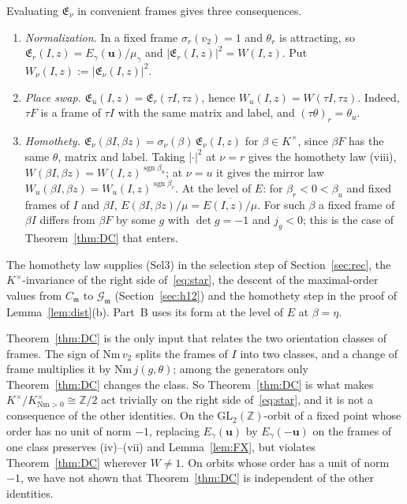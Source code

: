 \documentclass[11pt]{amsart}
\numberwithin{equation}{section}
\theoremstyle{plain}
\theoremstyle{definition}
\theoremstyle{remark}
\begin{document}
Evaluating \(\mathfrak E_\nu\) in convenient frames gives three consequences.
\begin{enumerate}
\item[(a)] \emph{Normalization.} In a fixed frame \(\sigma_r(v_2)=1\) and \(\theta_r\) is attracting, so \(\mathfrak E_r(I,z)=E_\gamma(\mathbf u)/\mu_\gamma\) and \(|\mathfrak E_r(I,z)|^2=W(I,z)\). Put \(W_\nu(I,z):=|\mathfrak E_\nu(I,z)|^2\).
\item[(b)] \emph{Place swap.} \(\mathfrak E_u(I,z)=\mathfrak E_r(\tau I,\tau z)\), hence \(W_u(I,z)=W(\tau I,\tau z)\). Indeed, \(\tau F\) is a frame of \(\tau I\) with the same matrix and label, and \((\tau\theta)_r=\theta_u\).
\item[(c)] \emph{Homothety.} \(\mathfrak E_\nu(\beta I,\beta z)=\sigma_\nu(\beta)\,\mathfrak E_\nu(I,z)\) for \(\beta\in K^\times\), since \(\beta F\) has the same \(\theta\), matrix and label. Taking \(|\cdot|^2\) at \(\nu=r\) gives the homothety law (viii), \(W(\beta I,\beta z)=W(I,z)^{\operatorname{sgn}\beta_u}\); at \(\nu=u\) it gives the mirror law \(W_u(\beta I,\beta z)=W_u(I,z)^{\operatorname{sgn}\beta_r}\). At the level of \(E\): for \(\beta_r<0<\beta_u\) and fixed frames of \(I\) and \(\beta I\), \(E(\beta I,\beta z)/\mu=\overline{E(I,z)/\mu}\). For such \(\beta\) a fixed frame of \(\beta I\) differs from \(\beta F\) by some \(g\) with \(\det g=-1\) and \(j_g<0\); this is the case of Theorem~\ref{thm:DC} that enters.
\end{enumerate}

The homothety law supplies (Sel3) in the selection step of Section~\ref{sec:rec}, the \(K^\times\)-invariance of the right side of~\eqref{eq:star}, the descent of the maximal-order values from \(C_{\mathfrak m}\) to \(\mathcal G_{\mathfrak m}\) (Section~\ref{sec:h12}) and the homothety step in the proof of Lemma~\ref{lem:dist}(b). Part~B uses its form at the level of \(E\) at \(\beta=\eta\).

Theorem~\ref{thm:DC} is the only input that relates the two orientation classes of frames. The sign of \(\mathrm{Nm}\,v_2\) splits the frames of \(I\) into two classes, and a change of frame multiplies it by \(\mathrm{Nm}\,j(g,\theta)\); among the generators only Theorem~\ref{thm:DC} changes the class. So Theorem~\ref{thm:DC} is what makes \(K^\times/K^\times_{\mathrm{Nm}>0}\cong\mathbb Z/2\) act trivially on the right side of~\eqref{eq:star}, and it is not a consequence of the other identities. On the \(\mathrm{GL}_2(\mathbb Z)\)-orbit of a fixed point whose order has no unit of norm \(-1\), replacing \(E_\gamma(\mathbf u)\) by \(E_\gamma(-\mathbf u)\) on the frames of one class preserves (iv)--(vii) and Lemma~\ref{lem:FX}, but violates Theorem~\ref{thm:DC} wherever \(W\ne1\). On orbits whose order has a unit of norm \(-1\), we have not shown that Theorem~\ref{thm:DC} is independent of the other identities.
\end{document}
